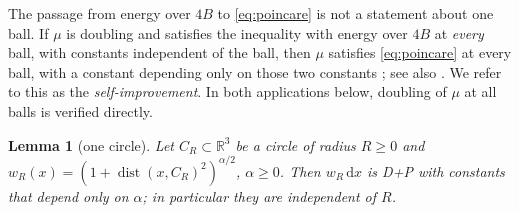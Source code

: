 \documentclass[11pt]{amsart}
\newcommand{\R}{\mathbb{R}}
\newcommand{\dd}{\,\mathrm{d}}
\DeclareMathOperator{\dist}{dist}
\theoremstyle{plain}
\newtheorem{lemma}[theorem]{Lemma}
\theoremstyle{definition}
\theoremstyle{remark}
\begin{document}
The passage from energy over $4B$ to \eqref{eq:poincare} is not a statement
about one ball. If $\mu$ is doubling and satisfies the inequality with energy
over $4B$ at \emph{every} ball, with constants independent of the ball, then
$\mu$ satisfies \eqref{eq:poincare} at every ball, with a constant depending
only on those two constants \cite[Thm.~5.1 and Cor.~9.8, with the statements
on the constants on pp.~23 and~44]{hajlaszkoskela2000}; see also
\cite[Thm.~2.4]{sturm1996}. We refer to this as the \emph{self-improvement}.
In both applications below, doubling of $\mu$ at all balls is verified
directly.

\begin{lemma}[one circle]\label{lem:circle}
Let $C_R\subset\R^3$ be a circle of radius $R\ge0$ and $w_R(x)=(1+\dist(x,C_R)^2)^{\alpha/2}$,
$\alpha\ge0$. Then $w_R\dd x$ is D+P with constants that depend only on
$\alpha$; in particular they are independent of $R$.
\end{lemma}
\end{document}
